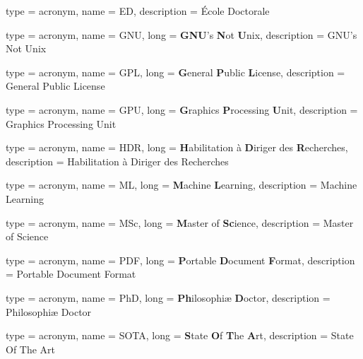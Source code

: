 {
    type        = {acronym},
    name        = {ED},
    description = {École Doctorale}
}

{
    type        = {acronym},
    name        = {GNU},
    long        = {\textbf{GNU}'s \textbf{N}ot \textbf{U}nix},
    description = {GNU's Not Unix}
}

{
    type        = {acronym},
    name        = {GPL},
    long        = {\textbf{G}eneral \textbf{P}ublic \textbf{L}icense},
    description = {General Public License}
}

{
    type        = {acronym},
    name        = {GPU},
    long        = {\textbf{G}raphics \textbf{P}rocessing \textbf{U}nit},
    description = {Graphics Processing Unit}
}

{
    type        = {acronym},
    name        = {HDR},
    long        = {\textbf{H}abilitation à \textbf{D}iriger des \textbf{R}echerches},
    description = {Habilitation à Diriger des Recherches}
}

{
    type        = {acronym},
    name        = {ML},
    long        = {\textbf{M}achine \textbf{L}earning},
    description = {Machine Learning}
}

{
    type        = {acronym},
    name        = {MSc},
    long        = {\textbf{M}aster of \textbf{Sc}ience},
    description = {Master of Science}
}

{
    type        = {acronym},
    name        = {PDF},
    long        = {\textbf{P}ortable \textbf{D}ocument \textbf{F}ormat},
    description = {Portable Document Format}
}

{
    type        = {acronym},
    name        = {PhD},
    long        = {\textbf{Ph}ilosophiæ \textbf{D}octor},
    description = {Philosophiæ Doctor}
}

{
    type        = {acronym},
    name        = {SOTA},
    long        = {\textbf{S}tate \textbf{O}f \textbf{T}he \textbf{A}rt},
    description = {State Of The Art}
}
